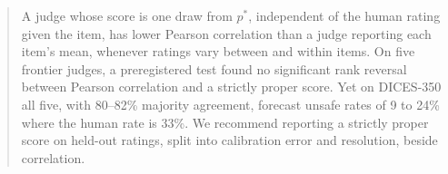 \begin{abstract}
A judge whose score is one draw from $p^*$, independent of the human rating given the item, has lower Pearson correlation than a judge reporting each item's mean, whenever ratings vary between and within items.
On five frontier judges, a preregistered test found no significant rank reversal between Pearson correlation and a strictly proper score.
Yet on DICES-350 all five, with 80--82\% majority agreement, forecast unsafe rates of 9 to 24\% where the human rate is 33\%.
We recommend reporting a strictly proper score on held-out ratings, split into calibration error and resolution, beside correlation.
\end{abstract}
